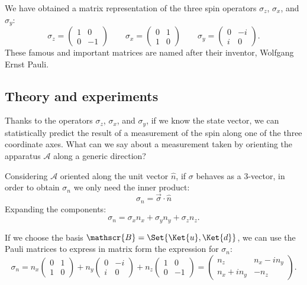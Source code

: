 We have obtained a matrix representation of the three spin operators $\sigma_z$, $\sigma_x$, and $\sigma_y$:
\begin{equation}
	\sigma_z = 
	\begin{pmatrix}
		1 & 0\\
		0 & -1
	\end{pmatrix} \quad\quad
	\sigma_x = 
	\begin{pmatrix}
		0 & 1\\
		1 & 0
	\end{pmatrix} \quad\quad
	\sigma_y = 
	\begin{pmatrix}
		0 & -i\\
		i & 0
	\end{pmatrix}.
	\label{eqn:pauli_op}
\end{equation}
These famous and important matrices are named after their inventor, Wolfgang Ernst Pauli.

\subsection{Theory and experiments}
Thanks to the operators $\sigma_z$, $\sigma_x$, and $\sigma_y$, if we know the state vector, we can statistically predict the result of a measurement of the spin along one of the three coordinate axes. What can we say about a measurement taken by orienting the apparatus $\mathcal{A}$ along a generic direction?

Considering $\mathcal{A}$ oriented along the unit vector $\hat{n}$, if $\sigma$ behaves as a 3-vector, in order to obtain $\sigma_n$ we only need the inner product:
\[
\sigma_n = \vec{\sigma} \cdot \hat{n}
\]
Expanding the components:
\[
\sigma_n = \sigma_xn_x+\sigma_yn_y+\sigma_zn_z.
\]

If we choose the basis $\mathscr{B} = \Set{\Ket{u}, \Ket{d}}$, we can use the Pauli matrices to express in matrix form the expression for $\sigma_n$:
\begin{equation*}
	\sigma_n = n_x
	\begin{pmatrix}
		0 & 1\\
		1 & 0
	\end{pmatrix}
	+ n_y
	\begin{pmatrix}
		0 & -i\\
		i & 0
	\end{pmatrix}
	+ n_z
	\begin{pmatrix}
		1 & 0\\
		0 & -1
	\end{pmatrix} 	
	= 
	\begin{pmatrix}
		n_z & n_x - in_y\\
		n_x + in_y & -n_z
	\end{pmatrix}.
\end{equation*}

